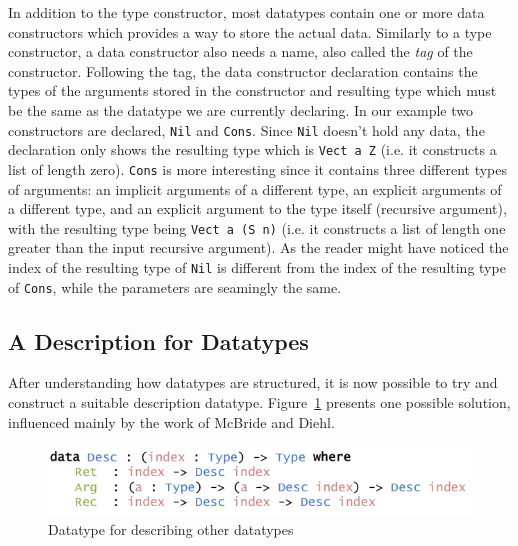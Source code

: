 \documentclass{ituthesis}
\begin{document}
In addition to the type constructor, most datatypes contain one or more data constructors which provides a way to store the actual data. Similarly to a type constructor, a data constructor also needs a name, also called the \textit{tag} of the constructor.
Following the tag, the data constructor declaration contains the types of the arguments stored in the constructor and resulting type which must be the same as the datatype we are currently declaring.
In our example two constructors are declared, \texttt{Nil} and \texttt{Cons}.
Since \texttt{Nil} doesn't hold any data, the declaration only shows the resulting type which is \texttt{Vect a Z} (i.e. it constructs a list of length zero).
\texttt{Cons} is more interesting since it contains three different types of arguments: an implicit arguments of a different type, an explicit arguments of a different type, and an explicit argument to the type itself (recursive argument), with the resulting type being \texttt{Vect a (S n)} (i.e. it constructs a list of length one greater than the input recursive argument).
As the reader might have noticed the index of the resulting type of \texttt{Nil} is different from the index of the resulting type of \texttt{Cons}, while the parameters are seamingly the same.

\subsection{A Description for Datatypes}
\label{sub:ADescriptionforDatatypes}
After understanding how datatypes are structured, it is now possible to try and construct a suitable description datatype. Figure~\ref{fig:descriptiondatatype} presents one possible solution, influenced mainly by the work of McBride and Diehl.

\begin{figure}[ht]
\begin{center}
    \includegraphics[scale=0.5]{Figures/ADescriptionforDatatypes.png}
\end{center}
\caption{Datatype for describing other datatypes}
\label{fig:descriptiondatatype}
\end{figure}
\end{document}
